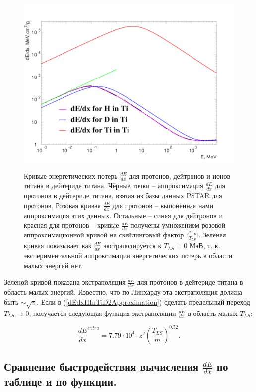 \documentclass[a4paper,12pt]{article}
\begin{document}
\begin{large}
\begin{figure}[ht]
  {
     \includegraphics[width=0.99\linewidth]{images/dedx.pdf}
  }
  \caption{Кривые энергетических потерь $\frac{dE}{dx}$ для протонов, дейтронов и ионов титана в дейтериде титана. Чёрные точки -- аппроксимация $\frac{dE}{dx}$ для протонов в дейтериде титана, взятая из базы данных PSTAR для протонов. Розовая кривая $\frac{dE}{dx}$ для протонов -- выпоненная нами аппроксимация этих данных. Остальные -- синяя для дейтронов и красная для протонов -- кривые $\frac{dE}{dx}$ получены умножением розовой аппроксимационной кривой на скейлинговый фактор $\frac{z^2 \cdot m}{T_{LS}}$. Зелёная кривая показывает как $\frac{dE}{dx}$ экстраполируется к $T_{LS}=0$ МэВ, т. к. экспериментальной аппроксимации энергетических потерь в области малых энергий нет.}
  \label{fig:DeDxInTiD2Plot}
\end{figure}

	Зелёной кривой показана экстраполяция $\frac{dE}{dx}$ для протонов в дейтериде титана в область малых энергий.
	Известно, что по Линхарду эта экстраполяция должна быть $\sim \sqrt{v}$.
	Если в (\ref{dEdxHInTiD2Approximation}) сделать предельный переход $T_{LS} \to 0$, получается следующая функция экстраполяции $\frac{dE}{dx}$ в область малых $T_{LS}$:

\begin{equation}
  \label{dEdxLinhardExtrapolationInSmallTls}	
  \frac{dE}{dx}^{extra}=7.79 \cdot 10^4  \cdot z^2 \left( \frac{T_{LS}}{m} \right)^{0.52}.
\end{equation}

\subsection{Сравнение быстродействия вычисления $\frac{dE}{dx}$ по таблице и по функции.}
\label{ValdEdx2}	


\end{large}
\end{document}

